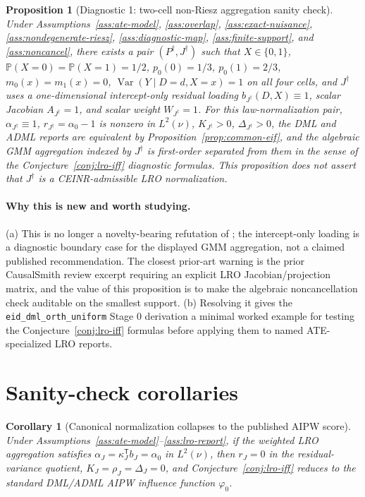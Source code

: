 \documentclass[11pt]{article}
\renewcommand{\Pr}{\mathbb{P}}
\newcommand{\transpose}{\mathsf{T}}
\theoremstyle{definition}
\theoremstyle{plain}
\newtheorem{proposition}{Proposition}
\newtheorem{corollary}{Corollary}
\theoremstyle{remark}
\begin{document}
\begin{proposition}[Diagnostic 1: two-cell non-Riesz aggregation sanity check]\label{prop:two-cell}
Under Assumptions~\ref{ass:ate-model}, \ref{ass:overlap}, \ref{ass:exact-nuisance}, \ref{ass:nondegenerate-riesz}, \ref{ass:diagnostic-map}, \ref{ass:finite-support}, and \ref{ass:noncancel}, there exists a pair $(P^\dagger,J^\dagger)$ such that $X\in\{0,1\}$, $\Pr(X=0)=\Pr(X=1)=1/2$, $p_0(0)=1/3$, $p_0(1)=2/3$, $m_0(x)=m_1(x)=0$, $\operatorname{Var}(Y\mid D=d,X=x)=1$ on all four cells, and $J^\dagger$ uses a one-dimensional intercept-only residual loading $b_{J^\dagger}(D,X)\equiv1$, scalar Jacobian $A_{J^\dagger}=1$, and scalar weight $W_{J^\dagger}=1$.  For this law-normalization pair, $\alpha_{J^\dagger}\equiv1$, $r_{J^\dagger}=\alpha_0-1$ is nonzero in $L^2(\nu)$, $K_{J^\dagger}>0$, $\Delta_{J^\dagger}>0$, the DML and ADML reports are equivalent by Proposition~\ref{prop:common-eif}, and the algebraic GMM aggregation indexed by $J^\dagger$ is first-order separated from them in the sense of the Conjecture~\ref{conj:lro-iff} diagnostic formulas.  This proposition does not assert that $J^\dagger$ is a CEINR-admissible LRO normalization.
\end{proposition}
\paragraph{Why this is new and worth studying.}
(a) This is no longer a novelty-bearing refutation of \citet{ChernozhukovEscancianoIchimuraNeweyRobins2022LRO}; the intercept-only loading is a diagnostic boundary case for the displayed GMM aggregation, not a claimed published recommendation.  The closest prior-art warning is the prior CausalSmith review excerpt requiring an explicit LRO Jacobian/projection matrix, and the value of this proposition is to make the algebraic noncancellation check auditable on the smallest support.  (b) Resolving it gives the \texttt{eid\_dml\_orth\_uniform} Stage 0 derivation a minimal worked example for testing the Conjecture~\ref{conj:lro-iff} formulas before applying them to named ATE-specialized LRO reports.

\section{Sanity-check corollaries}
\begin{corollary}[Canonical normalization collapses to the published AIPW score]\label{cor:canonical}
Under Assumptions~\ref{ass:ate-model}--\ref{ass:lro-report}, if the weighted LRO aggregation satisfies $\alpha_J=\kappa_J^\transpose b_J=\alpha_0$ in $L^2(\nu)$, then $r_J=0$ in the residual-variance quotient, $K_J=\rho_J=\Delta_J=0$, and Conjecture~\ref{conj:lro-iff} reduces to the standard DML/ADML AIPW influence function $\varphi_0$.
\end{corollary}
\end{document}
